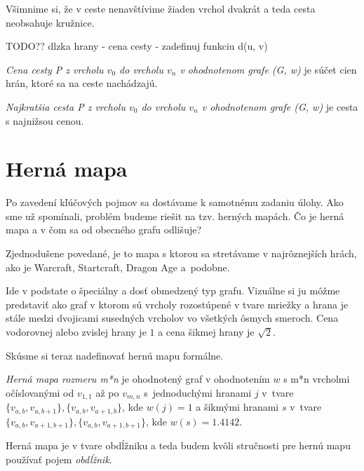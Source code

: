 Všimnime si, že v ceste nenavštívime žiaden vrchol dvakrát a teda cesta neobsahuje kružnice.

TODO?? dlzka hrany - cena cesty - zadefinuj funkciu d(u, v)

\begin{define}
{\sl Cena cesty P z vrcholu $v_0$ do vrcholu $v_n$ v ohodnotenom grafe (G, w) } je súčet cien hrán, ktoré sa na ceste nachádzajú.
\end{define}

\begin{define}
{\sl Najkratšia cesta P z vrcholu $v_0$ do vrcholu $v_n$
v ohodnotenom grafe (G, w)} 
je cesta s najnižsou cenou.
\end{define}





\section{Herná mapa}

Po zavedení kľúčových pojmov sa dostávame k samotnému zadaniu úlohy. 
Ako sme už spomínali, problém budeme riešit na tzv. herných mapách. Čo je herná mapa a v čom sa od obecného grafu odlišuje?

Zjednodušene povedané, je to mapa s ktorou sa stretávame v najrôznejších hrách, ako je Warcraft, Startcraft, Dragon Age
a~podobne.

Ide v podstate o špeciálny a dosť obmedzený typ grafu. Vizuálne si ju môžme predstaviť ako graf v ktorom sú vrcholy rozostúpené v tvare mriežky a hrana
je stále medzi dvojicami susedných vrcholov vo všetkých ôsmych smeroch. Cena vodorovnej alebo zvislej hrany je $1$ a cena šikmej hrany je $\sqrt{2}$.


Skúsme si teraz nadefinovať hernú mapu formálne.

\begin{define}
{\sl Herná mapa rozmeru m*n} je ohodnotený graf v ohodnotením $w$ s m*n vrcholmi očíslovanými od $v_{1,1}$ až po $v_{m,n}$ 
s~jednoduchými hranami $j$ v~tvare $\{v_{a,b}, v_{a,b+1}\}, \{v_{a,b}, v_{a+1,b}\}$, kde $w(j) = 1$ 
a šikmými hranami $ s $ v~tvare $\{v_{a,b}, v_{a+1,b+1}\}, \{v_{a,b}, v_{a+1,b+1}\}$, kde $ w(s) = 1.4142 $.
\end{define}

\begin{note}
	Herná mapa je v tvare obdĺžniku a teda budem kvôli stručnosti pre hernú mapu používať pojem {\sl obdĺžnik}.
\end{note}

